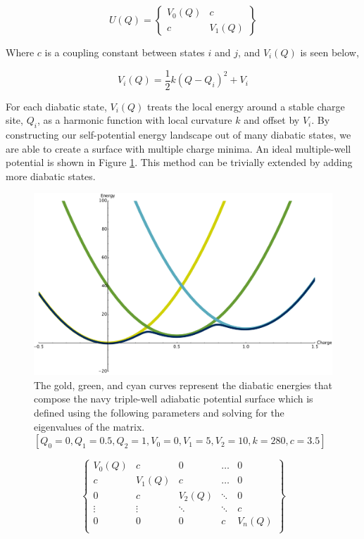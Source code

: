 \begin{equation}
U(Q) =
\begin{Bmatrix}
 V_0(Q) & c  \\
 c   & V_1(Q)
\end{Bmatrix}
\end{equation}

Where $c$ is a coupling constant between states $i$ and $j$, and $V_i(Q)$ is
seen below,

\begin{equation*}
V_i(Q) = \frac{1}{2}k(Q - Q_i)^2 + V_i
\end{equation*}

For each diabatic state, $V_i(Q)$ treats the local energy around a stable charge
site, $Q_i$, as a harmonic function with local curvature $k$ and offset by $V_i$.
By constructing our self-potential energy landscape out of many
diabatic states, we are able to create a surface with multiple charge minima.
An ideal multiple-well potential is shown in Figure \ref{fig:multipleDiabat}.
This method can be trivially extended by adding more diabatic states.

\begin{figure}
  \centering
  \includegraphics[width=0.75\linewidth]{../figures/chap5/multipleDiabats.pdf}
  \caption{The gold, green, and cyan curves represent the diabatic energies
that compose the navy triple-well adiabatic potential surface which is defined
using the following parameters and solving for the eigenvalues of the matrix.
$[Q_0 = 0, Q_1 = 0.5, Q_2 = 1, V_0 = 0, V_1 = 5, V_2 = 10, k = 280, c = 3.5]$}
\label{fig:multipleDiabat}
\end{figure}

\begin{equation*}
  \begin{Bmatrix}
    V_0(Q) & c      & 0      & \dots  & 0\\
    c      & V_1(Q) & c      & \dots & 0\\
    0      & c      & V_2(Q) & \ddots & 0 \\
    \vdots & \vdots & \ddots & \ddots & c\\
    0      & 0      & 0      &  c     & V_n(Q) \\
    \end{Bmatrix}
\end{equation*}

